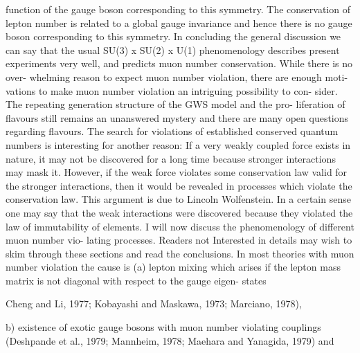 \documentclass[twoside]{article}
\begin{document}
{{{function of the gauge boson corresponding to this symmetry. The
conservation of lepton number is related to a global gauge invariance
and hence there is no gauge boson corresponding to this symmetry.
In concluding the general discussion we can say that the usual
SU(3) x SU(2) x U(1) phenomenology describes present experiments very
well, and predicts muon number conservation. While there is no over-
whelming reason to expect muon number violation, there are enough moti-
vations to make muon number violation an intriguing possibility to con-
sider. The repeating generation structure of the GWS model and the pro-
liferation of flavours still remains an unanswered mystery and there are
many open questions regarding flavours. The search for violations of
established conserved quantum numbers is interesting for another reason:
If a very weakly coupled force exists in nature, it may not be discovered
for a long time because stronger interactions may mask it. However, if
the weak force violates some conservation law valid for the stronger
interactions, then it would be revealed in processes which violate the
conservation law. This argument is due to Lincoln Wolfenstein. In a
certain sense one may say that the weak interactions were discovered
because they violated the law of immutability of elements.
I will now discuss the phenomenology of different muon number vio-
lating processes. Readers not Interested in details may wish to skim
through these sections and read the conclusions. In most theories with
muon number violation the cause is (a) lepton mixing which arises if
the lepton mass matrix is not diagonal with respect to the gauge eigen-
states {Cheng and Li, 1977; Kobayashi and Maskawa, 1973; Marciano, 1978),
{b) existence of exotic gauge bosons with muon number violating couplings
(Deshpande et al., 1979; Mannheim, 1978; Maehara and Yanagida, 1979) and

}}}}}
\end{document}
